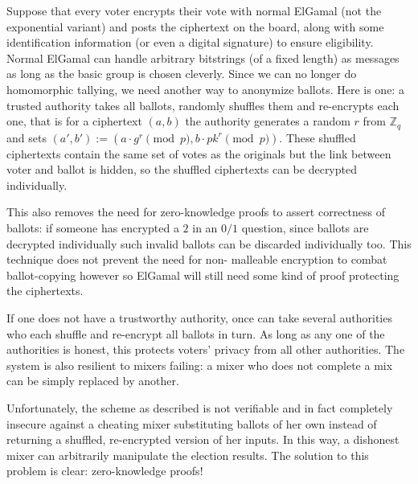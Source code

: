 \documentclass{llncs}
\begin{document}
Suppose that every voter encrypts their vote with normal ElGamal (not the
exponential variant) and posts the ciphertext on the board, along with some
identification information (or even a digital signature) to ensure eligibility.
Normal ElGamal can handle arbitrary bitstrings (of a fixed length) as messages
as long as the basic group is chosen cleverly\footnotemark.
Since we can no longer do homomorphic tallying, we need another way to anonymize
ballots. Here is one: a trusted authority takes all ballots, randomly shuffles
them and re-encrypts each one, that is for a ciphertext $(a, b)$ the authority
generates a random $r$ from $\mathbb Z_q$ and sets
$(a', b') := (a \cdot g^r \pmod{p}, b \cdot pk^r \pmod{p})$.
These shuffled ciphertexts contain the same set of votes as the originals but
the link between voter and ballot is hidden, so the shuffled ciphertexts can be
decrypted individually.

This also removes the need for zero-knowledge proofs to assert correctness of
ballots: if someone has encrypted a $2$ in an $0/1$ question, since ballots are
decrypted individually such invalid ballots can be discarded individually too.
This technique does not prevent the need for non- malleable encryption to combat
ballot-copying however so ElGamal will still need some kind of proof protecting
the ciphertexts.

If one does not have a trustworthy authority, once can take several authorities
who each shuffle and re-encrypt all ballots in turn. As long as any one of the
authorities is honest, this protects voters' privacy from all other authorities.
The system is also resilient to mixers failing: a mixer who does not complete a
mix can be simply replaced by another.

Unfortunately, the scheme as described is not verifiable and in fact completely
insecure against a cheating mixer substituting ballots of her own instead of
returning a shuffled, re-encrypted version of her inputs. In this way, a
dishonest mixer can arbitrarily manipulate the election results. The solution to
this problem is clear: zero-knowledge proofs!
\end{document}
